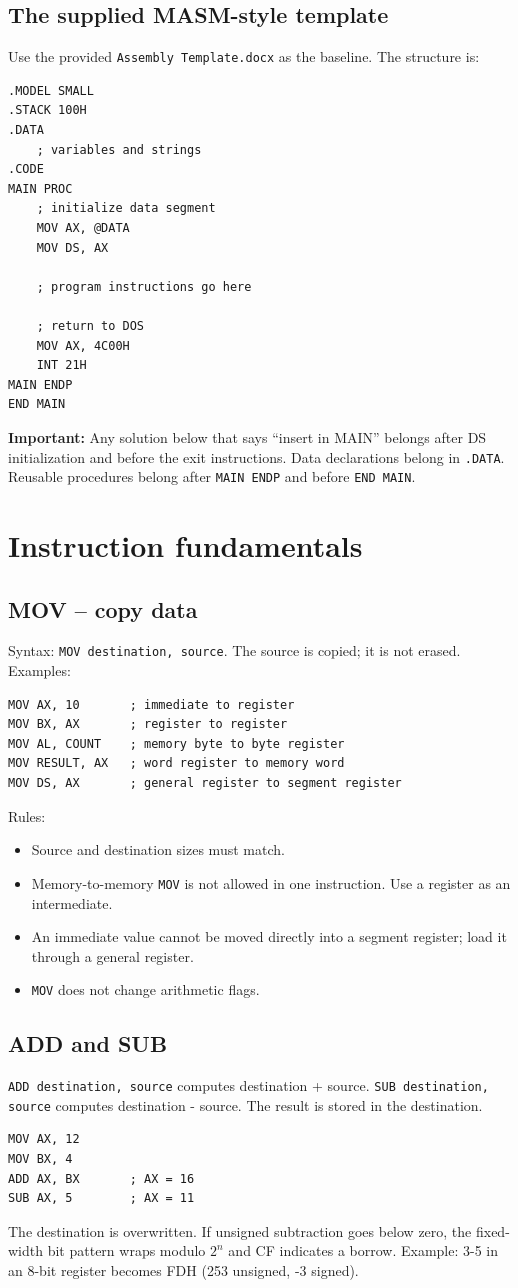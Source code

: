 \documentclass[11pt,a4paper]{article}
\begin{document}
\subsection{The supplied MASM-style template}
Use the provided \texttt{Assembly Template.docx} as the baseline. The structure is:
\begin{lstlisting}[style=asm]
.MODEL SMALL
.STACK 100H
.DATA
    ; variables and strings
.CODE
MAIN PROC
    ; initialize data segment
    MOV AX, @DATA
    MOV DS, AX

    ; program instructions go here

    ; return to DOS
    MOV AX, 4C00H
    INT 21H
MAIN ENDP
END MAIN
\end{lstlisting}
\textbf{Important:} Any solution below that says ``insert in MAIN'' belongs after DS initialization and before the exit instructions. Data declarations belong in \texttt{.DATA}. Reusable procedures belong after \texttt{MAIN ENDP} and before \texttt{END MAIN}.

\section{Instruction fundamentals}
\subsection{MOV -- copy data}
Syntax: \texttt{MOV destination, source}. The source is copied; it is not erased. Examples:
\begin{lstlisting}[style=asm]
MOV AX, 10       ; immediate to register
MOV BX, AX       ; register to register
MOV AL, COUNT    ; memory byte to byte register
MOV RESULT, AX   ; word register to memory word
MOV DS, AX       ; general register to segment register
\end{lstlisting}
Rules:
\begin{itemize}
\item Source and destination sizes must match.
\item Memory-to-memory \texttt{MOV} is not allowed in one instruction. Use a register as an intermediate.
\item An immediate value cannot be moved directly into a segment register; load it through a general register.
\item \texttt{MOV} does not change arithmetic flags.
\end{itemize}

\subsection{ADD and SUB}
\texttt{ADD destination, source} computes destination + source. \texttt{SUB destination, source} computes destination - source. The result is stored in the destination.
\begin{lstlisting}[style=asm]
MOV AX, 12
MOV BX, 4
ADD AX, BX       ; AX = 16
SUB AX, 5        ; AX = 11
\end{lstlisting}
The destination is overwritten. If unsigned subtraction goes below zero, the fixed-width bit pattern wraps modulo $2^n$ and CF indicates a borrow. Example: 3-5 in an 8-bit register becomes FDH (253 unsigned, -3 signed).
\end{document}
